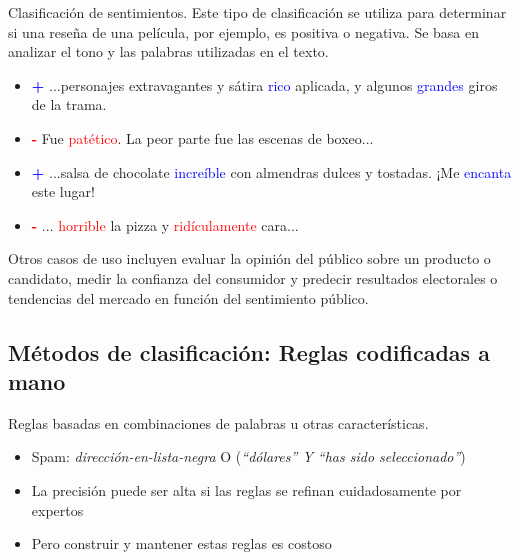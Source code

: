 \documentclass[11pt,fleqn]{book} %
\begin{document}
\begin{example}
Clasificación de sentimientos.
Este tipo de clasificación se utiliza para determinar si una reseña de una película, por ejemplo, es positiva o negativa. Se basa en analizar el tono y las palabras utilizadas en el texto.



\begin{itemize}
    \item \textcolor{blue}{\textbf{+}} ...personajes extravagantes y sátira \textcolor{blue}{rico} aplicada, y algunos \textcolor{blue}{grandes} giros de la trama.
    \item \textcolor{red}{\textbf{-}} Fue \textcolor{red}{patético}. La peor parte fue las escenas de boxeo...
    \item \textcolor{blue}{\textbf{+}} ...salsa de chocolate \textcolor{blue}{increíble} con almendras dulces y tostadas. ¡Me \textcolor{blue}{encanta} este lugar!
    \item \textcolor{red}{\textbf{-}} ... \textcolor{red}{horrible} la pizza y \textcolor{red}{ridículamente} cara...
\end{itemize}

Otros casos de uso incluyen evaluar la opinión del público sobre un producto o candidato, medir la confianza del consumidor y predecir resultados electorales o tendencias del mercado en función del sentimiento público.
\end{example}









\subsection{Métodos de clasificación: Reglas codificadas a mano}

Reglas basadas en combinaciones de palabras u otras características.

\begin{itemize}
    \item Spam: \textit{dirección-en-lista-negra} O (\textit{“dólares” Y “has sido seleccionado”})
    \item La precisión puede ser alta si las reglas se refinan cuidadosamente por expertos
    \item Pero construir y mantener estas reglas es costoso
\end{itemize}
\end{document}
